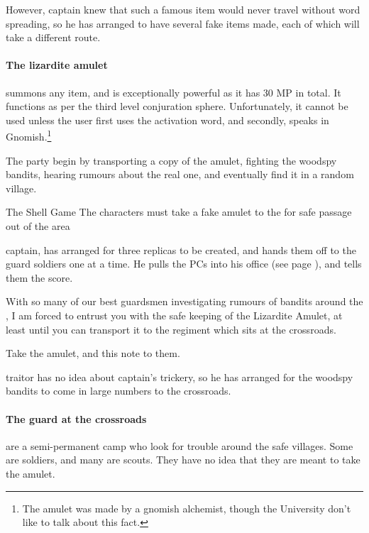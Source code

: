 \begin{multicols}{2}
However, \gls{captain} knew that such a famous item would never travel without word spreading, so he has arranged to have several fake items made, each of which will take a different route.

\paragraph{The lizardite amulet}
summons any item, and is exceptionally powerful as it has 30 MP in total.  It functions as per the third level conjuration sphere.  Unfortunately, it cannot be used unless the user first uses the activation word, and secondly, speaks in Gnomish.\footnote{The amulet was made by a gnomish alchemist, though the University don't like to talk about this fact.}


The party begin by transporting a copy of the amulet, fighting the woodspy bandits, hearing rumours about the real one, and eventually find it in a random village.

{The Shell Game}%
{The characters must take a fake amulet to the  for safe passage out of the area}%

\Gls{captain}, has arranged for three replicas to be created, and hands them off to the \gls{guard} soldiers one at a time.
He pulls the PCs into his office (see page \pageref{guardstation}), and tells them the score.

\begin{speechtext}

  With so many of our best guardsmen investigating rumours of bandits around the , I am forced to entrust you with the safe keeping of the Lizardite Amulet, at least until you can transport it to the regiment which sits at the crossroads.

  Take the amulet, and this note to them.

\end{speechtext}

\Gls{traitor} has no idea about \gls{captain}'s trickery, so he has arranged for the woodspy bandits to come in large numbers to the crossroads.

\paragraph{The \gls{guard} at the crossroads}
are a semi-permanent camp who look for trouble around the safe villages.
Some are soldiers, and many are scouts.
They have no idea that they are meant to take the amulet.


\end{multicols}

